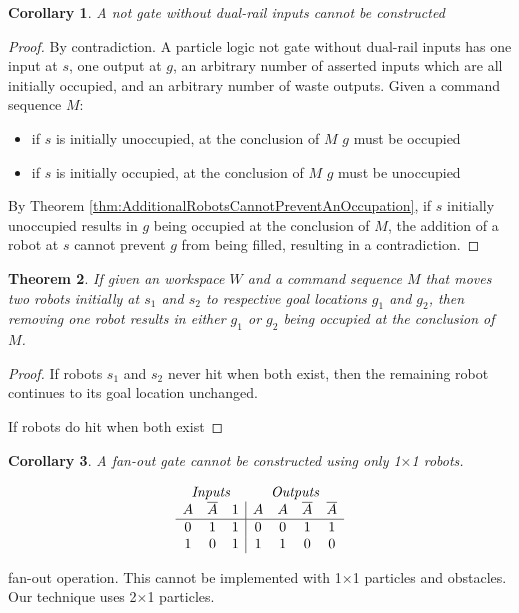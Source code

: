 \documentclass[letterpaper, 10 pt, conference]{ieeeconf}
\newcommand{\todo}[1]{\vspace{5 mm}\par \noindent \framebox{\begin{minipage}[c]{0.98 \columnwidth} \ttfamily\flushleft \textcolor{red}{#1}\end{minipage}}\vspace{5 mm}\par}
\newtheorem{theorem}{Theorem}
\newtheorem{corollary}[theorem]{Corollary}
\begin{document}
\begin{corollary}
A  {\sc not} gate without dual-rail inputs cannot be constructed
\end{corollary}
\begin{proof}
By contradiction.
A particle logic {\sc not} gate without dual-rail inputs has one input at $s$, one output at $g$, an arbitrary number of asserted inputs which are all initially occupied, and an arbitrary number of waste outputs.
Given a command sequence $M$:  
\begin{itemize}
\item if $s$ is initially unoccupied, at the conclusion of $M$ $g$ must be occupied
\item if $s$ is initially occupied, at the conclusion of $M$ $g$ must be unoccupied
\end{itemize}
By Theorem \ref{thm:AdditionalRobotsCannotPreventAnOccupation}, if $s$ initially unoccupied results in $g$ being occupied at the conclusion of $M$, the addition of a robot at $s$ cannot prevent $g$ from being filled, resulting in a contradiction.
\end{proof}


\begin{theorem}\label{thm:TwoRobotsTwoGoalsImpliesOneRobotOneGoal} 
If given an workspace $W$ and a command sequence $M$ that moves two robots initially at $s_1$ and $s_2$ to respective goal locations $g_1$ and $g_2$, then removing one robot results in either $g_1$ or $g_2$ being occupied at the conclusion of $M$.
\end{theorem}

\begin{proof}
If robots $s_1$ and $s_2$ never hit when both exist, then the remaining robot continues to its goal location unchanged.

If robots do hit when both exist \todo{show that this cannot lead to a goal location $g_3$, when only one robot is used, it goes to the goal location occupied by the last robot to be hit when there are two. }
\end{proof}


\begin{corollary}\label{cor:No1x1FanOut}
A  {\sc fan-out} gate cannot be constructed using only 1$\times$1 robots.
\end{corollary}

  \begin{table}
\begin{displaymath}
\begin{array}{ccc|cccc}
\multicolumn{3}{c}{\emph{Inputs}} & \multicolumn{4}{c}{\emph{Outputs}} \\
   A
 & \overline{A}
 & 1
 & A
 & A
 &  \overline{A}
 & \overline{A}\\
\hline
0 & 1 & 1 & 0 & 0 & 1 & 1  \\
1 & 0 & 1 & 1 & 1 & 0 & 0  \\
\end{array}
\end{displaymath}
\caption{{\sc fan-out} operation. This cannot be implemented with 1$\times$1 particles and obstacles.   Our technique uses 2$\times$1 particles. }
  \label{tab:Fanout}
\end{table}
\end{document}
